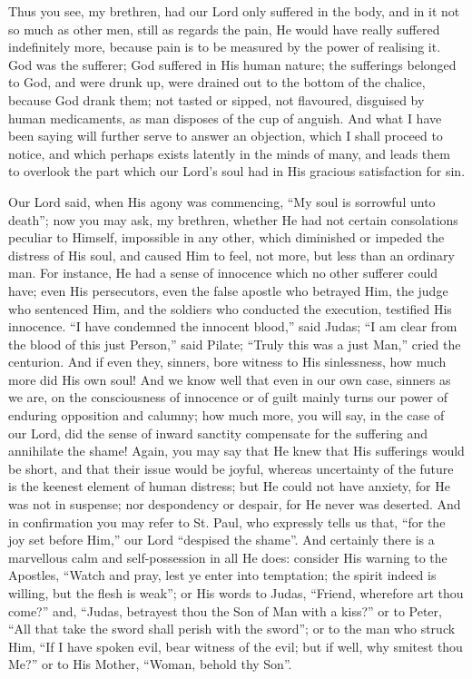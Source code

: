 Thus you see, my brethren, had our Lord only suffered in the body,
and in it not so much as other men, still as regards the pain, He
would have really suffered indefinitely more, because pain is to be
measured by the power of realising it. God was the sufferer; God
suffered in His human nature; the sufferings belonged to God, and were
drunk up, were drained out to the bottom of the chalice, because God
drank them; not tasted or sipped, not flavoured, disguised by human
medicaments, as man disposes of the cup of anguish. And what I have
been saying will further serve to answer an objection, which I shall
proceed to notice, and which perhaps exists latently in the minds of
many, and leads them to overlook the part which our Lord's soul had in
His gracious satisfaction for sin.

Our Lord said, when His agony was commencing, ``My soul is
sorrowful unto death''; now you may ask, my brethren, whether He
had not certain consolations peculiar to Himself, impossible in any
other, which diminished or impeded the distress of His soul, and
caused Him to feel, not more, but less than an ordinary man. For
instance, He had a sense of innocence which no other sufferer could
have; even His persecutors, even the false apostle who betrayed Him,
the judge who sentenced Him, and the soldiers who conducted the
execution, testified His innocence. ``I have condemned the
innocent blood,'' said Judas; ``I am clear from the blood of
this just Person,'' said Pilate; ``Truly this was a just
Man,'' cried the centurion. And if even they, sinners, bore
witness to His sinlessness, how much more did His own soul! And we
know well that even in our own case, sinners as we are, on the
consciousness of innocence or of guilt mainly turns our power of
enduring opposition and calumny; how much more, you will say, in the
case of our Lord, did the sense of inward sanctity compensate for the
suffering and annihilate the shame! Again, you may say that He knew
that His sufferings would be short, and that their issue would be
joyful, whereas uncertainty of the future is the keenest element of
human distress; but He could not have anxiety, for He was not in
suspense; nor despondency or despair, for He never was deserted. And
in confirmation you may refer to St. Paul, who expressly tells us
that, ``for the joy set before Him,'' our Lord ``despised
the shame''. And certainly there is a marvellous calm and
self-possession in all He does: consider His warning to the Apostles,
``Watch and pray, lest ye enter into temptation; the spirit
indeed is willing, but the flesh is weak''; or His words to Judas,
``Friend, wherefore art thou come?'' and, ``Judas,
betrayest thou the Son of Man with a kiss?'' or to Peter,
``All that take the sword shall perish with the sword''; or to
the man who struck Him, ``If I have spoken evil, bear witness of
the evil; but if well, why smitest thou Me?'' or to His Mother,
``Woman, behold thy Son''.

